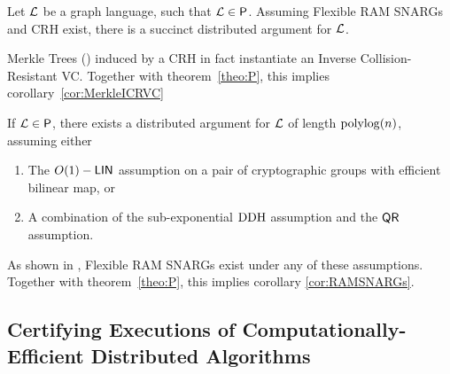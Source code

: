 \begin{corollary}\label{cor:MerkleICRVC}
    Let $\mathcal{L}$ be a graph language, such that $\mathcal{L}\in {\mathsf{P}}$. Assuming Flexible RAM SNARGs and CRH exist, there is a succinct distributed argument for $\mathcal{L}$.  
\end{corollary}
Merkle Trees (\cite{merkle1989certified}) induced by a CRH in fact instantiate an Inverse Collision-Resistant VC. Together with theorem~\ref{theo:P}, this implies corollary~\ref{cor:MerkleICRVC}

\begin{corollary}\label{cor:RAMSNARGs}
    If $\mathcal{L}\in{\mathsf{P}}$, there exists a distributed argument for $\mathcal{L}$ of length $\operatorname{polylog}(n)$, assuming either
    \begin{enumerate}
        \item The $O(1)-\mathsf{LIN}$ assumption on a pair of cryptographic groups with efficient bilinear map, or
        \item A combination of the sub-exponential $\mathrm{DDH}$ assumption and the $\mathsf{QR}$ assumption.
    \end{enumerate}
\end{corollary}
As shown in  \cite{cryptoeprint:2022/1320}, Flexible RAM SNARGs exist under any of these assumptions. Together with theorem~\ref{theo:P}, this implies corollary \ref{cor:RAMSNARGs}.

\subsection{Certifying Executions of Computationally-Efficient Distributed Algorithms}
\label{app:distprover}

